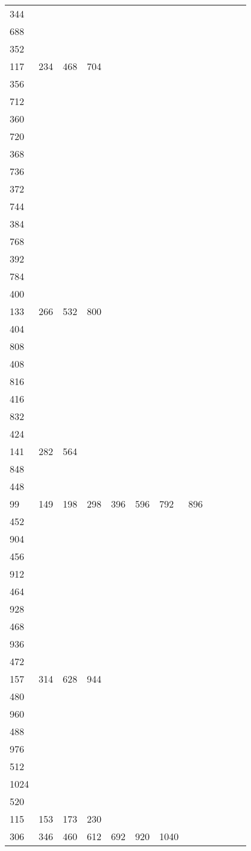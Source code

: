 \begin{longtable}{llllllllllll}
344&&&&&&&&&&&\\
688& \\
352&&&&&&&&&&&\\
117& 234& 468& 704& \\
356&&&&&&&&&&&\\
712& \\
360&&&&&&&&&&&\\
720& \\
368&&&&&&&&&&&\\
736& \\
372&&&&&&&&&&&\\
744\\
384&&&&&&&&&&&\\
768& \\
392&&&&&&&&&&&\\
784& \\
400&&&&&&&&&&&\\
133& 266& 532& 800& \\
404&&&&&&&&&&&\\
808& \\
408&&&&&&&&&&&\\
816& \\
416&&&&&&&&&&&\\
832& \\
424&&&&&&&&&&&\\
141& 282& 564\\
848& \\
448&&&&&&&&&&&\\
99& 149& 198& 298& 396& 596& 792& 896& \\
452&&&&&&&&&&&\\
904& \\
456&&&&&&&&&&&\\
912& \\
464&&&&&&&&&&&\\
928\\
468&&&&&&&&&&&\\
936& \\
472&&&&&&&&&&&\\
157& 314& 628& 944& \\
480&&&&&&&&&&&\\
960& \\
488&&&&&&&&&&&\\
976& \\
512&&&&&&&&&&&\\
1024& \\
520&&&&&&&&&&&\\
115& 153& 173& 230\\
306& 346& 460& 612& 692& 920& 1040& \\

\end{longtable}
